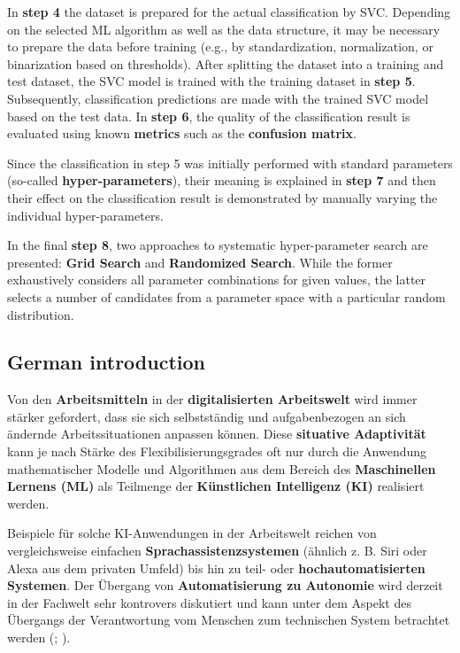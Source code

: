 \documentclass [oneside,10pt,a4paper,ngerman,BCOR10mm,headsepline,parindent,final]{scrartcl}
\begin{document}
In \textbf{step 4} the dataset is prepared for the actual classification
by SVC. Depending on the selected ML algorithm as well as the data
structure, it may be necessary to prepare the data before training
(e.g., by standardization, normalization, or binarization based on
thresholds). After splitting the dataset into a training and test
dataset, the SVC model is trained with the training dataset in
\textbf{step 5}. Subsequently, classification predictions are made with
the trained SVC model based on the test data. In \textbf{step 6}, the
quality of the classification result is evaluated using known
\textbf{metrics} such as the \textbf{confusion matrix}.

Since the classification in step 5 was initially performed with standard
parameters (so-called \textbf{hyper-parameters}), their meaning is
explained in \textbf{step 7} and then their effect on the classification
result is demonstrated by manually varying the individual
hyper-parameters.

In the final \textbf{step 8}, two approaches to systematic
hyper-parameter search are presented: \textbf{Grid Search} and
\textbf{Randomized Search}. While the former exhaustively considers all
parameter combinations for given values, the latter selects a number of
candidates from a parameter space with a particular random distribution.

    \hypertarget{german-introduction}{%
\subsection{German introduction}\label{german-introduction}}

Von den \textbf{Arbeitsmitteln} in der \textbf{digitalisierten
Arbeitswelt} wird immer stärker gefordert, dass sie sich selbstständig
und aufgabenbezogen an sich ändernde Arbeitssituationen anpassen können.
Diese \textbf{situative Adaptivität} kann je nach Stärke des
Flexibilisierungsgrades oft nur durch die Anwendung mathematischer
Modelle und Algorithmen aus dem Bereich des \textbf{Maschinellen Lernens
(ML)} als Teilmenge der \textbf{Künstlichen Intelligenz (KI)} realisiert
werden.

Beispiele für solche KI-Anwendungen in der Arbeitswelt reichen von
vergleichsweise einfachen \textbf{Sprachassistenzsystemen} (ähnlich z.
B. Siri oder Alexa aus dem privaten Umfeld) bis hin zu teil- oder
\textbf{hochautomatisierten Systemen}. Der Übergang von
\textbf{Automatisierung zu Autonomie} wird derzeit in der Fachwelt sehr
kontrovers diskutiert und kann unter dem Aspekt des Übergangs der
Verantwortung vom Menschen zum technischen System betrachtet werden
(\cite{Adler_2021}; \cite{Adler_2019}).
\end{document}
